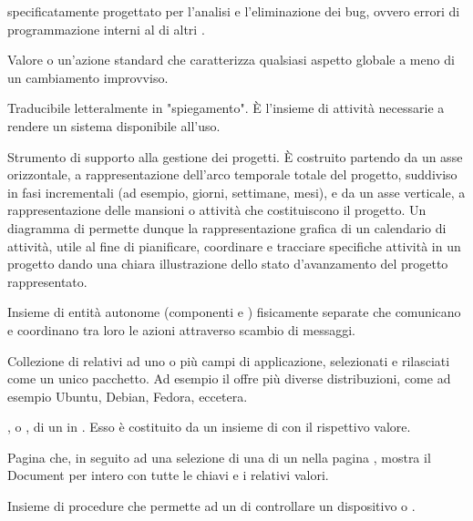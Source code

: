 { specificatamente progettato per l'analisi e l'eliminazione dei bug, ovvero errori di programmazione interni al  di altri .}

{Valore o un'azione standard che caratterizza qualsiasi aspetto globale a meno di un cambiamento improvviso.}

{Traducibile letteralmente in "spiegamento". \`{E} l'insieme di attività necessarie a rendere un sistema  disponibile all'uso.}





{Strumento di supporto alla gestione dei progetti. \`{E} costruito partendo da un asse orizzontale, a rappresentazione dell'arco temporale totale del progetto, suddiviso in fasi incrementali (ad esempio, giorni, settimane, mesi), e da un asse verticale, a rappresentazione delle mansioni o attività che costituiscono il progetto. Un diagramma di  permette dunque la rappresentazione grafica di un calendario di attività, utile al fine di pianificare, coordinare e tracciare specifiche attività in un progetto dando una chiara illustrazione dello stato d'avanzamento del progetto rappresentato.} 



{Insieme di entità autonome (componenti  e ) fisicamente separate che comunicano e coordinano tra loro le azioni attraverso scambio di messaggi.}

{Collezione di  relativi ad uno o più campi di applicazione, selezionati e rilasciati come un unico pacchetto. Ad esempio il   offre più diverse distribuzioni, come ad esempio Ubuntu, Debian, Fedora, eccetera.}

{, o , di un  in . Esso è costituito da un insieme di  con il rispettivo valore.}


{Pagina che, in seguito ad una selezione di una  di un  nella pagina , mostra il Document per intero con tutte le chiavi e i relativi valori.}

{Insieme di procedure che permette ad un  di controllare un dispositivo  o .}

